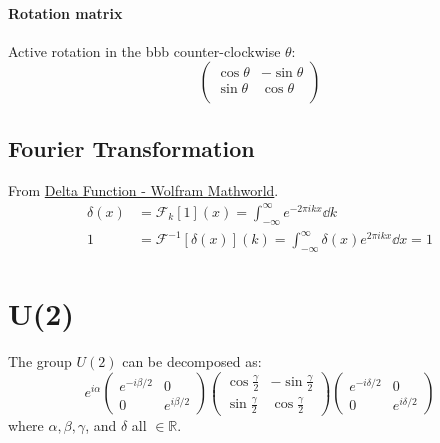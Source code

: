 \paragraph{Rotation matrix}
Active rotation in the bbb counter-clockwise $\theta$:
\begin{equation}
    \left(
    \begin{array}{cc}
        \cos{\theta} & -\sin{\theta} \\
        \sin{\theta} & \cos{\theta} \\
    \end{array}
    \right)
\end{equation}

\subsection{Fourier Transformation}
\label{sec:Fourier-Transformation}
From
\href{http://mathworld.wolfram.com/DeltaFunction.html}{Delta Function
- Wolfram Mathworld}.
\begin{align}
    \delta(x) &= \mathcal{F}_k[1](x) = \int_{-\infty}^{\infty}
        e^{-2\pi i kx} \dd k \\
    1 &= \mathcal{F}^{-1}[\delta(x)](k) = \int_{-\infty}^{\infty}
        \delta(x) e^{2\pi ikx}\dd x= 1
\end{align}


\section{U(2)}
\label{sec:U(2)}
The group $U(2)$ can be decomposed as:
\begin{equation}
  e^{i\alpha} \begin{pmatrix}
    e^{-i\beta/2} & 0 \\
    0 & e^{i\beta/2}
  \end{pmatrix}
  \begin{pmatrix}
    \cos \frac{\gamma}{2} & -\sin \frac{\gamma}{2} \\
    \sin \frac{\gamma}{2} & \cos \frac{\gamma}{2}
  \end{pmatrix}
  \begin{pmatrix}
    e^{-i\delta/2} & 0 \\
    0 & e^{i\delta/2}
  \end{pmatrix}
\end{equation}
where $\alpha,\beta,\gamma$, and $\delta$ all $\in \mathbb{R}$.
